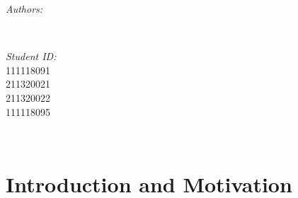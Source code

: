 \documentclass[12pt]{article}
\makeatletter
\let\theauthor\@author
\makeatother
\begin{document}
\begin{titlepage}
	\begin{minipage}{0.4\textwidth}
		\begin{flushleft} \large
			\emph{Authors:}\\
			\theauthor
			\end{flushleft}
			\end{minipage}~
			\begin{minipage}{0.4\textwidth}
			\begin{flushright} \large
			\emph{Student ID:} \\
			111118091 \\ 211320021 \\ 211320022 \\ 111118095%
		\end{flushright}
	\end{minipage}\\
	
	
 
	\vfill
	
\end{titlepage}


\tableofcontents
\pagebreak

\flushbottom


\section{Introduction and Motivation}
\end{document}
